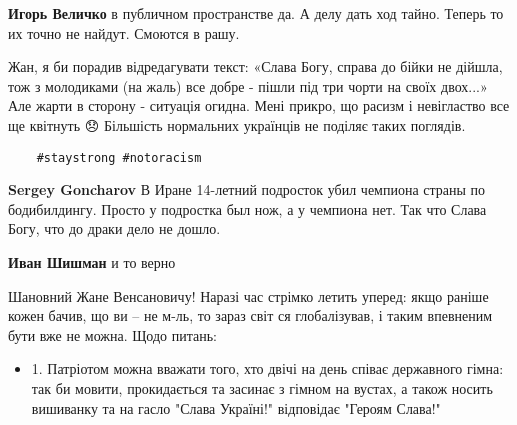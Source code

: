 \begin{itemize}
\begin{itemize}
 
\textbf{Игорь Величко} в публичном пространстве да. А делу дать ход тайно. Теперь то их точно не найдут. Смоются в рашу.
\end{itemize}


Жан, я би порадив відредагувати текст: «Слава Богу, справа до бійки не дійшла,
тож з молодиками (на жаль) все добре - пішли під три чорти на своїх двох...» Але
жарти в сторону - ситуація огидна. Мені прикро, що расизм і невігластво все ще
квітнуть 😞 Більшість нормальних українців не поділяє таких поглядів. 

\begin{verbatim}
	#staystrong #notoracism
\end{verbatim}

\begin{itemize}
 
\textbf{Sergey Goncharov} В Иране 14-летний подросток убил чемпиона страны по
бодибилдингу. Просто у подростка был нож, а у чемпиона нет. Так что Слава Богу,
что до драки дело не дошло.


\textbf{Иван Шишман} и то верно 👍🏻
\end{itemize}


Шановний Жане Венсановичу! Наразі час стрімко летить уперед: якщо раніше кожен
бачив, що ви – не м-ль, то зараз світ ся глобалізував, і таким впевненим бути
вже не можна. Щодо питань:

\begin{itemize}
\item 1. Патріотом можна вважати того, хто двічі на день співає державного гімна: так
би мовити, прокидається та засинає з гімном на вустах, а також носить вишиванку
та на гасло "Слава Україні!" відповідає "Героям Слава!"


\end{itemize}
\end{itemize}
